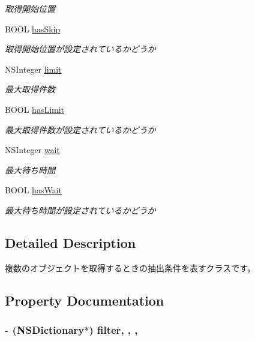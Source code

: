 \begin{DoxyCompactItemize}
\begin{DoxyCompactList}\small\item\em 取得開始位置 \end{DoxyCompactList}\item 
B\-O\-O\-L \hyperlink{interface_b_d_query_ac5cd3fcf3939d73daada130a4838b59b}{has\-Skip}
\begin{DoxyCompactList}\small\item\em 取得開始位置が設定されているかどうか \end{DoxyCompactList}\item 
N\-S\-Integer \hyperlink{interface_b_d_query_ae5afba095663a23c7fcac3feaa625d84}{limit}
\begin{DoxyCompactList}\small\item\em 最大取得件数 \end{DoxyCompactList}\item 
B\-O\-O\-L \hyperlink{interface_b_d_query_a71b336b5fbf46e03f96fc5f36affc84f}{has\-Limit}
\begin{DoxyCompactList}\small\item\em 最大取得件数が設定されているかどうか \end{DoxyCompactList}\item 
N\-S\-Integer \hyperlink{interface_b_d_query_a3d8a8401c6707f4903db51621eac9a62}{wait}
\begin{DoxyCompactList}\small\item\em 最大待ち時間 \end{DoxyCompactList}\item 
B\-O\-O\-L \hyperlink{interface_b_d_query_ac2158b8379abefe6d5bde1cd9d39028c}{has\-Wait}
\begin{DoxyCompactList}\small\item\em 最大待ち時間が設定されているかどうか \end{DoxyCompactList}\end{DoxyCompactItemize}


\subsection{Detailed Description}
複数のオブジェクトを取得するときの抽出条件を表すクラスです。 

\subsection{Property Documentation}
\hypertarget{interface_b_d_query_a4725c6a2f7235516b2a55f9264526c7c}{
\subsubsection[{filter}]{\setlength{\rightskip}{0pt plus 5cm}-\/ (N\-S\-Dictionary$\ast$) filter\hspace{0.3cm}{\ttfamily [read]}, {\ttfamily [write]}, {\ttfamily [nonatomic]}, {\ttfamily [assign]}}}\label{interface_b_d_query_a4725c6a2f7235516b2a55f9264526c7c}


